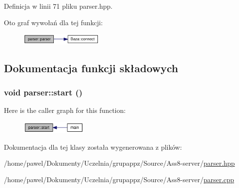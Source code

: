 Definicja w linii 71 pliku parser.hpp.

Oto graf wywołań dla tej funkcji:\nopagebreak
\begin{figure}[H]
\begin{center}
\leavevmode
\includegraphics[width=118pt]{classparser_3a237071a3ab764cd61bc53df9dd4f46_cgraph}
\end{center}
\end{figure}


\subsection{Dokumentacja funkcji składowych}
\hypertarget{classparser_7793913f528921aa22c4b6cc259a0a14}{
\subsubsection[{start}]{\setlength{\rightskip}{0pt plus 5cm}void parser::start ()}}
\label{classparser_7793913f528921aa22c4b6cc259a0a14}




Here is the caller graph for this function:\nopagebreak
\begin{figure}[H]
\begin{center}
\leavevmode
\includegraphics[width=94pt]{classparser_7793913f528921aa22c4b6cc259a0a14_icgraph}
\end{center}
\end{figure}


Dokumentacja dla tej klasy została wygenerowana z plików:\begin{CompactItemize}
\item 
/home/pawel/Dokumenty/Uczelnia/grupappz/Source/Ass8-server/\hyperlink{parser_8hpp}{parser.hpp}\item 
/home/pawel/Dokumenty/Uczelnia/grupappz/Source/Ass8-server/\hyperlink{parser_8cpp}{parser.cpp}\end{CompactItemize}
